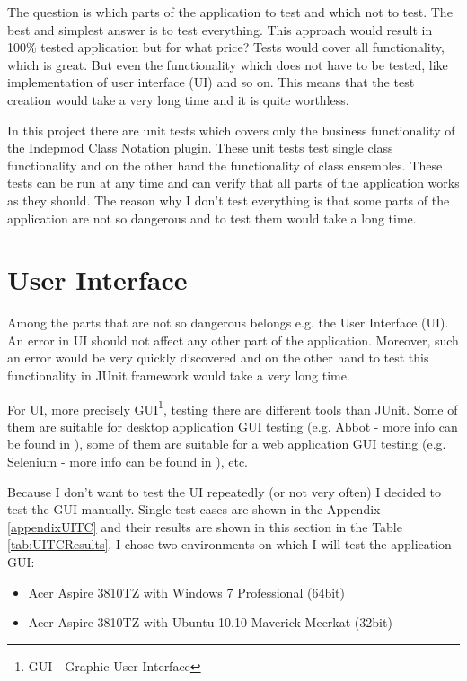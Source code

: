The question is which parts of the application to test and which not to test. The best and simplest answer is to test everything. This approach would result in 100\% tested application but for what price? Tests would cover all functionality, which is great. But even the functionality which does not have to be tested, like implementation of user interface (UI) and so on. This means that the test creation would take a very long time and it is quite worthless.

In this project there are unit tests which covers only the business functionality of the Indepmod Class Notation plugin. These unit tests test single class functionality and on the other hand the functionality of class ensembles. These tests can be run at any time and can verify that all parts of the application works as they should. The reason why I don't test everything is that some parts of the application are not so dangerous and to test them would take a long time. 

\section{User Interface}

Among the parts that are not so dangerous belongs e.g. the User Interface (UI). An error in UI should not affect any other part of the application. Moreover, such an error would be very quickly discovered and on the other hand  to test this functionality in JUnit framework would take a very long time.

For UI, more precisely GUI\footnote{GUI - Graphic User Interface}, testing there are different tools than JUnit. Some of them are suitable for desktop application GUI testing (e.g. Abbot - more info can be found in \cite{AbbotWeb}), some of them are suitable for a web application GUI testing (e.g. Selenium - more info can be found in \cite{SeleniumWeb}), etc. 

Because I don't want to test the UI repeatedly (or not very often) I decided to test the GUI manually. Single test cases are shown in the Appendix \ref{appendixUITC} and their results are shown in this section in the Table \ref{tab:UITCResults}. I chose two environments on which I will test the application GUI:

\begin{itemize}
    \item Acer Aspire 3810TZ with Windows 7 Professional (64bit)
    \item Acer Aspire 3810TZ with Ubuntu 10.10 Maverick Meerkat (32bit)
\end{itemize}

